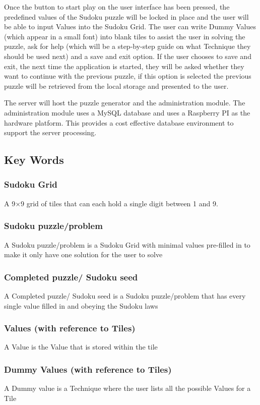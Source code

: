 \documentclass[fleqn]{article}
\begin{document}
Once the button to start play on the user interface has been pressed, the predefined values of the Sudoku puzzle will be locked in place and the user will be able to input Values into the Sudoku Grid. The user can write Dummy Values (which appear in a small font) into blank tiles to assist the user in solving the puzzle, ask for help (which will be a step-by-step guide on what Technique they should be used next) and a save and exit option. If the user chooses to save and exit, the next time the application is started, they will be asked whether they want to continue with the previous puzzle, if this option is selected the previous puzzle will be retrieved from the local storage and presented to the user.

The server will host the puzzle generator and the administration module. The administration module uses a MySQL database and uses a Raspberry PI as the hardware platform. This provides a cost effective database environment to support the server processing.

\subsection{Key Words}
\subsubsection*{Sudoku Grid}
A 9×9 grid of tiles that can each hold a single digit between 1 and 9. 
\subsubsection*{Sudoku puzzle/problem}
A Sudoku puzzle/problem is a Sudoku Grid with minimal values pre-filled in to make it only have one solution for the user to solve
\subsubsection*{Completed puzzle/ Sudoku seed}
A Completed puzzle/ Sudoku seed is a Sudoku puzzle/problem that has every single value filled in and obeying the Sudoku laws
\subsubsection*{Values (with reference to Tiles)}
A Value is the Value that is stored within the tile
\subsubsection*{Dummy Values (with reference to Tiles)}
A Dummy value is a Technique where the user lists all the possible Values for a Tile 
\end{document}
